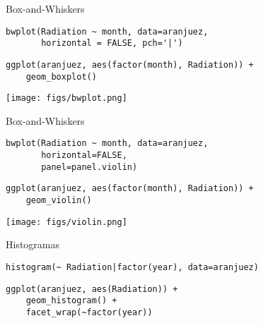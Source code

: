 \documentclass[aspectratio=169, usenames,svgnames,dvipsnames]{beamer}
\begin{document}
\begin{frame}[label={sec:org8da657a},fragile]{Box-and-Whiskers}
 \lstset{language=r,label= ,caption= ,captionpos=b,numbers=none}
\begin{lstlisting}
bwplot(Radiation ~ month, data=aranjuez,
       horizontal = FALSE, pch='|')
\end{lstlisting}

\lstset{language=r,label= ,caption= ,captionpos=b,numbers=none}
\begin{lstlisting}
ggplot(aranjuez, aes(factor(month), Radiation)) + 
    geom_boxplot()
\end{lstlisting}
\end{frame}

\begin{frame}[label={sec:orgeb97d86}]{}
\begin{center}
\texttt{[image: figs/bwplot.png]}
\end{center}
\end{frame}

\begin{frame}[label={sec:org2c0fcd7},fragile]{Box-and-Whiskers}
 \lstset{language=r,label= ,caption= ,captionpos=b,numbers=none}
\begin{lstlisting}
bwplot(Radiation ~ month, data=aranjuez,
       horizontal=FALSE,
       panel=panel.violin)
\end{lstlisting}

\lstset{language=r,label= ,caption= ,captionpos=b,numbers=none}
\begin{lstlisting}
ggplot(aranjuez, aes(factor(month), Radiation)) + 
    geom_violin()
\end{lstlisting}
\end{frame}

\begin{frame}[label={sec:org0fbae67}]{}
\begin{center}
\texttt{[image: figs/violin.png]}
\end{center}
\end{frame}


\begin{frame}[label={sec:org951f8d1},fragile]{Histogramas}
 \lstset{language=r,label= ,caption= ,captionpos=b,numbers=none}
\begin{lstlisting}
histogram(~ Radiation|factor(year), data=aranjuez)
\end{lstlisting}

\lstset{language=r,label= ,caption= ,captionpos=b,numbers=none}
\begin{lstlisting}
ggplot(aranjuez, aes(Radiation)) + 
    geom_histogram() +
    facet_wrap(~factor(year))
\end{lstlisting}
\end{frame}
\end{document}
